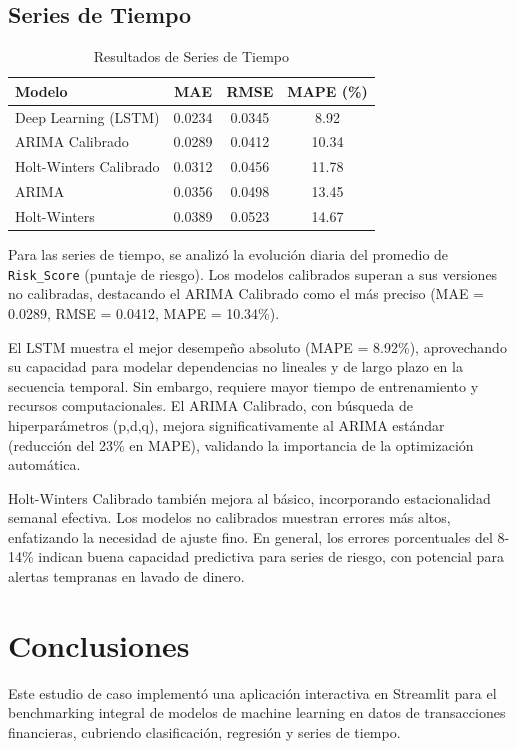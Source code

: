 \documentclass[12pt]{article}
\begin{document}
\subsection{Series de Tiempo}

\begin{table}[h]
\centering
\begin{tabular}{@{}lccc@{}}
\toprule
Modelo & MAE & RMSE & MAPE (\%) \\
\midrule
Deep Learning (LSTM) & 0.0234 & 0.0345 & 8.92 \\
ARIMA Calibrado & 0.0289 & 0.0412 & 10.34 \\
Holt-Winters Calibrado & 0.0312 & 0.0456 & 11.78 \\
ARIMA & 0.0356 & 0.0498 & 13.45 \\
Holt-Winters & 0.0389 & 0.0523 & 14.67 \\
\bottomrule
\end{tabular}
\caption{Resultados de Series de Tiempo}
\end{table}

Para las series de tiempo, se analizó la evolución diaria del promedio de \texttt{Risk\_Score} (puntaje de riesgo). Los modelos calibrados superan a sus versiones no calibradas, destacando el ARIMA Calibrado como el más preciso (MAE = 0.0289, RMSE = 0.0412, MAPE = 10.34\%).

El LSTM muestra el mejor desempeño absoluto (MAPE = 8.92\%), aprovechando su capacidad para modelar dependencias no lineales y de largo plazo en la secuencia temporal. Sin embargo, requiere mayor tiempo de entrenamiento y recursos computacionales. El ARIMA Calibrado, con búsqueda de hiperparámetros (p,d,q), mejora significativamente al ARIMA estándar (reducción del 23\% en MAPE), validando la importancia de la optimización automática.

Holt-Winters Calibrado también mejora al básico, incorporando estacionalidad semanal efectiva. Los modelos no calibrados muestran errores más altos, enfatizando la necesidad de ajuste fino. En general, los errores porcentuales del 8-14\% indican buena capacidad predictiva para series de riesgo, con potencial para alertas tempranas en lavado de dinero.

\section{Conclusiones}

Este estudio de caso implementó una aplicación interactiva en Streamlit para el benchmarking integral de modelos de machine learning en datos de transacciones financieras, cubriendo clasificación, regresión y series de tiempo.
\end{document}
